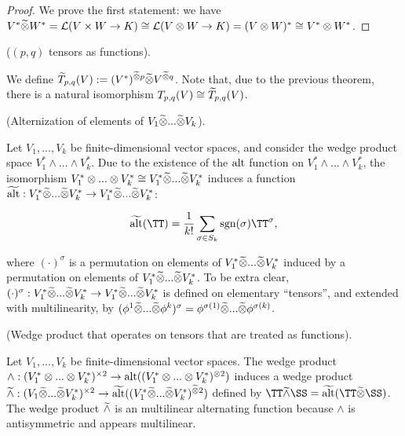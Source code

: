 \begin{proof}
   We prove the first statement: we have $V^* \widetilde{\otimes} W^* = \mathcal{L}(V \times W \rightarrow K) \cong \mathcal{L}(V \otimes W \rightarrow K) = (V \otimes W)^* \cong V^* \otimes W^*$.
\end{proof}

\begin{defn}
    ($(p, q)$ tensors as functions).
    
    We define $\widetilde{T}_{p,q}(V) := (V^*)^{\widetilde{\otimes} p} \widetilde{\otimes} V^{\widetilde{\otimes} q}$. Note that, due to the previous theorem, there is a natural isomorphism $T_{p,q}(V) \cong \widetilde{T}_{p,q}(V)$.
\end{defn}

\begin{deriv}
    (Alternization of elements of $V_1 \widetilde{\otimes} ... \widetilde{\otimes} V_k$).
    
    Let $V_1, ..., V_k$ be finite-dimensional vector spaces, and consider the wedge product space $V_1^* \wedge ... \wedge V_k^*$. Due to the existence of the $\text{alt}$ function on $V_1^* \wedge ... \wedge V_k^*$, the isomorphism $V_1^* \otimes ... \otimes V_k^* \cong V_1^* \widetilde{\otimes} ... \widetilde{\otimes} V_k^*$ induces a function $\widetilde{\text{alt}}:V_1^* \widetilde{\otimes} ... \widetilde{\otimes} V_k^* \rightarrow V_1^* \widetilde{\otimes} ... \widetilde{\otimes} V_k^*$:
    
    \begin{align*}
        \talt(\TT) = \frac{1}{k!} \sum_{\sigma \in S_k} \sgn(\sigma) \TT^\sigma,
    \end{align*}
    
    where $(\cdot)^\sigma$ is a permutation on elements of $V_1^* \widetilde{\otimes} ... \widetilde{\otimes} V_k^*$ induced by a permutation on elements of $V_1^* \widetilde{\otimes} ... \widetilde{\otimes} V_k^*$. To be extra clear, $(\cdot)^\sigma:V_1^* \widetilde{\otimes} ... \widetilde{\otimes} V_k^* \rightarrow V_1^* \widetilde{\otimes} ... \widetilde{\otimes} V_k^*$ is defined on elementary ``tensors'', and extended with multilinearity, by $(\phi^1 \widetilde{\otimes} ... \widetilde{\otimes} \phi^k)^\sigma = \phi^{\sigma(1)} \widetilde{\otimes} ... \widetilde{\otimes} \phi^{\sigma(k)}$.
\end{deriv}

\begin{deriv}
    (Wedge product that operates on tensors that are treated as functions).
    
    Let $V_1, ..., V_k$ be finite-dimensional vector spaces. The wedge product ${\wedge:(V_1^* \otimes ... \otimes V_k^*)^{\times 2} \rightarrow \text{alt}((V_1^* \otimes ... \otimes V_k^*)^{\otimes 2})}$ induces a wedge product ${\widetilde{\wedge}: (V_1 \widetilde{\otimes} ... \widetilde{\otimes} V_k^*)^{\times 2} \rightarrow \widetilde{\text{alt}}((V_1^* \widetilde{\otimes} ... \widetilde{\otimes} V_k^*)^{\widetilde{\otimes} 2})}$ defined by $\TT \twedge \SS = \talt(\TT \totimes \SS)$. The wedge product $\widetilde{\wedge}$ is an multilinear alternating function because $\wedge$ is antisymmetric and appears multilinear.
\end{deriv}

